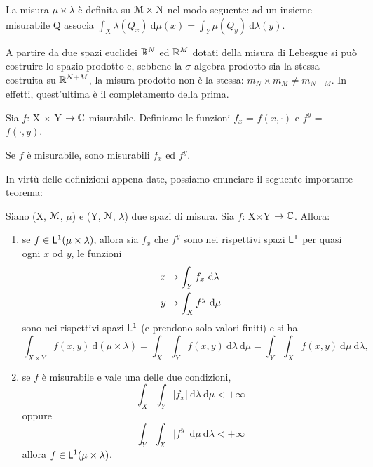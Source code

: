 \documentclass[Completo.tex]{subfiles}
\begin{document}
	\begin{Def}
		La misura $\mu \times \lambda$ è definita su $\eu[M] \times \eu[N]$ nel modo seguente: ad un insieme misurabile Q associa $\int_X \lambda(Q_x) \ \mathrm{d}\mu(x) = \int_Y \mu(Q_y) \ \mathrm{d}\lambda(y)$.
	\end{Def}
	\begin{Ex}
		A partire da due spazi euclidei $\bb[R]^{N}$ ed $\bb[R]^{M}$ dotati della misura di Lebesgue si può costruire lo spazio prodotto e, sebbene la $\sigma$-algebra prodotto sia la stessa costruita su $\bb[R]^{N+M}$, la misura prodotto non è la stessa: $m_N \times m_M \neq m_{N+M}$. In effetti, quest'ultima è il completamento della prima.
	\end{Ex}
	\begin{Def}
		Sia $f$: X $\times$ Y $\ra \bb[C]$ misurabile. Definiamo le funzioni $f_x$ = $f(x, \cdot)$ e $f^y$ = $f(\cdot, y)$.
	\end{Def}
	\begin{Prop}
		Se $f$ è misurabile, sono misurabili $f_x$ ed $f^y$.
	\end{Prop}
	In virtù delle definizioni appena date, possiamo enunciare il seguente importante teorema:
	\begin{Th}
		Siano (X, $\eu[M]$, $\mu$) e (Y, $\eu[N]$, $\lambda$) due spazi di misura. Sia $f$: X$\times$Y $\ra \bb[C]$. Allora:
		\begin{enumerate}
			\item se $f \in \sf[L]^1(\mu \times \lambda)$, allora sia $f_x$ che $f^y$ sono nei rispettivi spazi $\sf[L]^1$ per quasi ogni $x$ od $y$, le funzioni
			\begin{align*}
			x &\rightarrow \int_Y f_x \ \mathrm{d}\lambda \\
			y &\rightarrow \int_X f^y \ \mathrm{d}\mu
			\end{align*}
			sono nei rispettivi spazi $\sf[L]^1$ (e prendono solo valori finiti) e si ha
			\begin{equation*}
			\int_{X \times Y} f(x,y) \ \mathrm{d}(\mu \times \lambda) = \int_X \int_Y f(x,y) \ \mathrm{d}\lambda \ \mathrm{d}\mu = \int_Y \int_X f(x,y) \ \mathrm{d}\mu \ \mathrm{d}\lambda,
			\end{equation*}
			\item se $f$ è misurabile e vale una delle due condizioni,
			\begin{equation*}
			\int_X \int_Y \vert f_x \vert \ \mathrm{d}\lambda \ \mathrm{d}\mu < +\infty
			\end{equation*}
			oppure
			\begin{equation*}
			\int_Y \int_X \vert f^y \vert \ \mathrm{d}\mu \ \mathrm{d}\lambda < +\infty
			\end{equation*}
			allora $f \in \sf[L]^1(\mu \times \lambda)$.
		\end{enumerate}
	\end{Th}
\end{document}

